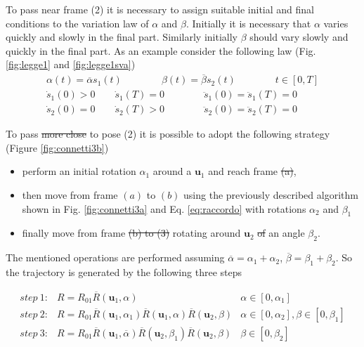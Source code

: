 \documentclass[preprint, 12pt]{elsarticle}
\def\vect#1{{\boldsymbol{#1}}}
\providecommand{\DIFadd}[1]{{\protect\color{blue}\uwave{#1}}} %
\providecommand{\DIFdel}[1]{{\protect\color{red}\sout{#1}}}                      %
\providecommand{\DIFaddbegin}{} %
\providecommand{\DIFaddend}{} %
\providecommand{\DIFdelbegin}{} %
\providecommand{\DIFdelend}{} %
\begin{document}
To pass near frame (2) it is necessary to assign suitable initial and final conditions to the variation law of  $\alpha$ and $\beta$. Initially it is necessary that $\alpha$ varies quickly and slowly in the final part. Similarly initially $\beta$ should vary slowly and quickly in the final part. As an example consider the following law (Fig. \ref{fig:legge1} and \DIFaddbegin \DIFadd{Fig. }\DIFaddend \ref{fig:legge1sva})
\begin{equation}
    \begin{array}{c}
        \alpha(t) = \overline{\alpha} s_{1}(t)
        \qquad\qquad
        \beta(t)=\overline{\beta} s_{2}(t)
        \qquad\qquad
        t \in \left[ 0, T \right] \\[2ex]
        \dot{s}_1(0)>0 \qquad \dot{s}_1(T)=0
        \qquad\qquad
        \ddot{s}_1(0)=\ddot{s}_1(T)=0\\[2ex]
        \dot{s}_2(0)=0 \qquad \dot{s}_2(T)>0
        \qquad\qquad
        \ddot{s}_2(0)=\ddot{s}_2(T)=0
    \end{array}
    \label{eq:cambiaA,B}
\end{equation}

To pass \DIFdelbegin \DIFdel{more close }\DIFdelend \DIFaddbegin \DIFadd{closer }\DIFaddend to pose (2) it is possible to adopt the following strategy (Figure \ref{fig:connetti3b})
\begin{itemize}
    \item perform an initial rotation  $\alpha_1$ around a $\vect{u}_1$ and reach frame \DIFdelbegin \DIFdel{(a)}\DIFdelend \DIFaddbegin \DIFadd{$(a)$}\DIFaddend ,
    \item then move from frame  $(a)$ to $(b)$ using the previously described algorithm shown in Fig. \ref{fig:connetti3a} and Eq. \ref{eq:raccordo} with rotations $\alpha_2$ and $\beta_1$
    \item finally move from frame \DIFdelbegin \DIFdel{(b) to (3) }\DIFdelend \DIFaddbegin \DIFadd{$(b)$ to $(3)$ }\DIFaddend rotating around $\vect{u}_2$ \DIFdelbegin \DIFdel{of }\DIFdelend \DIFaddbegin \DIFadd{by }\DIFaddend an angle $\beta_2$.
\end{itemize}
The mentioned operations are performed assuming $\overline{\alpha}=\alpha_1+\alpha_2$, $\overline{\beta}=\beta_1+\beta_2$.
So the trajectory is generated by the following three steps

\begin{equation}
    \begin{array}{lll}
        step\ 1: & R=R_{01}\overline{R}(\vect{u}_1,\alpha) & \alpha \in [0, \alpha_1]\\

        step\ 2: & R=R_{01}\overline{R}(\vect{u}_1,\alpha_1)\overline{R}(\vect{u}_1,\alpha)\overline{R}(\vect{u}_2,\beta) & \alpha \in [0, \alpha_2], \beta \in [0,\beta_1]\\

        step\ 3: &
        R=R_{01}\overline{R}(\vect{u}_1,\overline{\alpha})\overline{R}(\vect{u}_2,\beta_1)\overline{R}(\vect{u}_2,\beta) & \beta \in [0, \beta_2]
    \end{array}
    \label{eq:3step}
\end{equation}
\end{document}
